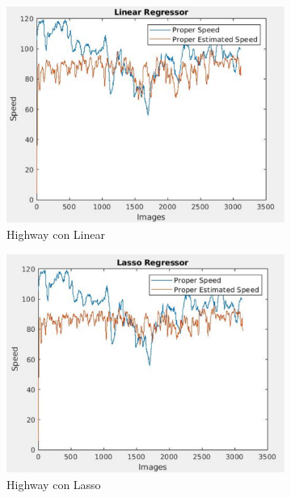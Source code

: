 \begin{figure}[H]
  \centering
  \begin{subfigure}[b]{0.45\linewidth}
    \includegraphics[width=\linewidth]{Figuras/Lineal_Highway(Nivel_1).eps}
    \caption{Highway con Linear}
  \end{subfigure}
    \begin{subfigure}[b]{0.425\linewidth}
    \includegraphics[width=\linewidth]{Figuras/Lasso_Highway(Nivel_1).eps}
    \caption{Highway con Lasso}
  \end{subfigure}
    \begin{subfigure}[b]{0.45\linewidth}

\end{subfigure}
\end{figure}
